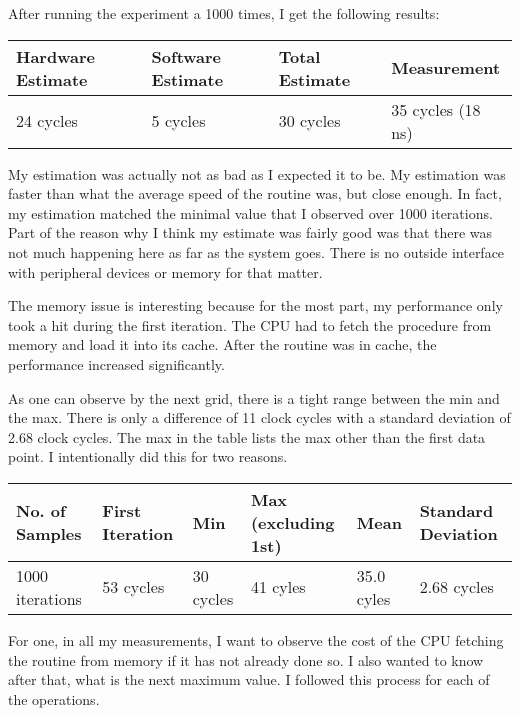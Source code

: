 \documentclass[paper=a4, fontsize=11pt]{scrartcl}
\numberwithin{equation}{section}        %
\numberwithin{figure}{section}          %
\numberwithin{table}{section}               %
\begin{document}
After running the experiment a 1000 times, I get the following results:

\begin{center}
    \begin{tabular}{ | l | l | l | l |}
    \hline
    Hardware Estimate & Software Estimate & Total Estimate & Measurement \\ \hline
    24 cycles & 5 cycles & 30 cycles & 35 cycles (18 ns) \\ 
    \hline
    \end{tabular}
\end{center}

My estimation was actually not as bad as I expected it to be.  My estimation was faster than what the average speed of the routine was, but close enough.  In fact, my estimation matched the minimal value that I observed over 1000 iterations.  Part of the reason why I think my estimate was fairly good was that there was not much happening here as far as the system goes.  There is no outside interface with peripheral devices or memory for that matter.

The memory issue is interesting because for the most part, my performance only took a hit during the first iteration.  The CPU had to fetch the procedure from memory and load it into its cache.  After the routine was in cache, the performance increased significantly.

As one can observe by the next grid, there is a tight range between the min and the max.  There is only a difference of 11 clock cycles with a standard deviation of 2.68 clock cycles.  The max in the table lists the max other than the first data point.  I intentionally did this for two reasons.

\begin{center}
    \begin{tabular}{ | l | l | l | l | l | l |}
    \hline
    No. of Samples & First Iteration & Min & Max (excluding 1st) & Mean & Standard Deviation \\ \hline
    1000 iterations & 53 cycles & 30 cycles & 41 cyles & 35.0 cyles & 2.68 cycles \\ 
    \hline
    \end{tabular}
\end{center}

For one, in all my measurements, I want to observe the cost of the CPU fetching the routine from memory if it has not already done so.  I also wanted to know after that, what is the next maximum value.  I followed this process for each of the operations.
\end{document}
